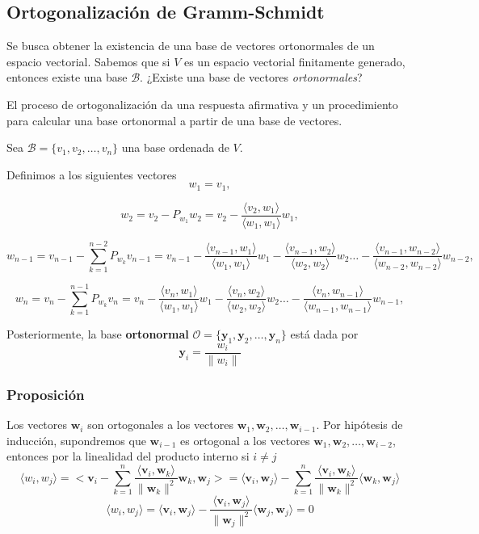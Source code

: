 \documentclass[
]{article}
\begin{document}
\hypertarget{ortogonalizaciuxf3n-de-gramm-schmidt}{%
\subsection{Ortogonalización de
Gramm-Schmidt}\label{ortogonalizaciuxf3n-de-gramm-schmidt}}

Se busca obtener la existencia de una base de vectores ortonormales de
un espacio vectorial. Sabemos que si \(V\) es un espacio vectorial
finitamente generado, entonces existe una base \(\mathcal{B}\). ¿Existe
una base de vectores \emph{ortonormales}?

El proceso de ortogonalización da una respuesta afirmativa y un
procedimiento para calcular una base ortonormal a partir de una base de
vectores.

Sea \(\mathcal{B}=\{v_1,v_2,\ldots,v_n\}\) una base ordenada de \(V\).

Definimos a los siguientes vectores \[
w_1=v_1,
\]

\[
w_2 = v_2 - P_{w_1}w_2 = v_2 - \frac{\langle v_2,w_1 \rangle}{\langle w_1,w_1 \rangle}w_1,
\]

\[
w_{n-1} = v_{n-1} - \sum^{n-2}_{k=1} P_{w_k}v_{n-1} = v_{n-1} - \frac{\langle v_{n-1},w_1 \rangle}{\langle w_1,w_1 \rangle}w_1- \frac{\langle v_{n-1},w_2 \rangle}{\langle w_2,w_2 \rangle}w_2 \ldots - \frac{\langle v_{n-1},w_{n-2} \rangle}{\langle w_{n-2},w_{n-2} \rangle}w_{n-2},
\]

\[
w_{n} = v_{n} - \sum^{n-1}_{k=1} P_{w_k}v_{n} = v_{n} - \frac{\langle v_{n},w_1 \rangle}{\langle w_1,w_1 \rangle}w_1- \frac{\langle v_{n},w_2 \rangle}{\langle w_2,w_2 \rangle}w_2 \ldots - \frac{\langle v_{n},w_{n-1} \rangle}{\langle w_{n-1},w_{n-1} \rangle}w_{n-1},
\]

Posteriormente, la base \textbf{ortonormal}
\(\mathcal{O}=\{\mathbf{y}_1,\mathbf{y}_2,\ldots , \mathbf{y}_n\}\) está
dada por \[
\mathbf{y}_i = \frac{w_i}{\|w_i\|}
\]

\hypertarget{proposiciuxf3n-2}{%
\subsubsection{Proposición}\label{proposiciuxf3n-2}}

Los vectores \(\mathbf{w}_i\) son ortogonales a los vectores
\(\mathbf{w}_1,\mathbf{w}_2,\ldots,\mathbf{w}_{i-1}\). Por hipótesis de
inducción, supondremos que \(\mathbf{w}_{i-1}\) es ortogonal a los
vectores \(\mathbf{w}_1,\mathbf{w}_2,\ldots,\mathbf{w}_{i-2}\), entonces
por la linealidad del producto interno si \(i\ne j\) \[
\langle w_i, w_j \rangle = \biggl< \mathbf{v}_{i} - \sum_{k=1}^{n} \frac{\langle \mathbf{v}_{i}, \mathbf{w}_{k} \rangle}{\|\mathbf{w}_k\|^2}\mathbf{w}_k,\mathbf{w}_j\biggr>= \langle \mathbf{v}_i, \mathbf{w}_j \rangle - \sum_{k=1}^n \frac{\langle \mathbf{v}_{i}, \mathbf{w}_{k} \rangle}{\|\mathbf{w}_k\|^2}\langle \mathbf{w}_k, \mathbf{w}_j \rangle
\] \[
\langle w_i, w_j \rangle = \langle \mathbf{v}_i, \mathbf{w}_j \rangle - 
 \frac{\langle \mathbf{v}_{i}, \mathbf{w}_{j} \rangle}{\|\mathbf{w}_j\|^2}\langle \mathbf{w}_j, \mathbf{w}_j \rangle=0
\]
\end{document}
